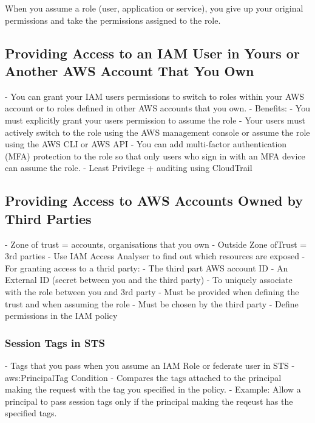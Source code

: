 \documentclass[11pt]{book}
\begin{document}
    When you assume a role (user, application or service), you give up your original permissions and take the permissions assigned to the role.

    \subsection{Providing Access to an IAM User in Yours or Another AWS Account That You Own}
    - You can grant your IAM users permissions to switch to roles within your AWS account or to roles defined in other AWS accounts that you own.
    - Benefits:
    - You must explicitly grant your users permission to assume the role
    - Your users must actively switch to the role using the AWS management console or assume the role using the AWS CLI or AWS API
    - You can add multi-factor authentication (MFA) protection to the role so that only users who sign in with an MFA device can assume the role.
    - Least Privilege + auditing using CloudTrail

    \subsection{Providing Access to AWS Accounts Owned by Third Parties}
    - Zone of trust = accounts, organisations that you own
    - Outside Zone ofTrust = 3rd parties
    - Use IAM Access Analyser to find out which resources are exposed
    - For granting access to a thrid party:
    - The third part AWS account ID
    - An External ID (secret between you and the third party)
    - To uniquely associate with the role between you and 3rd party
    - Must be provided when defining the trust and when assuming the role
    - Must be chosen by the third party
    - Define permissions in the IAM policy


    \subsubsection{Session Tags in STS}
    - Tags that you pass when you assume an IAM Role or federate user in STS
    - aws:PrincipalTag Condition
    - Compares the tags attached to the principal making the request with the tag you specified in the policy.
    - Example: Allow a principal to pass session tags only if the principal making the reqeust has the specified tags.
\end{document}
